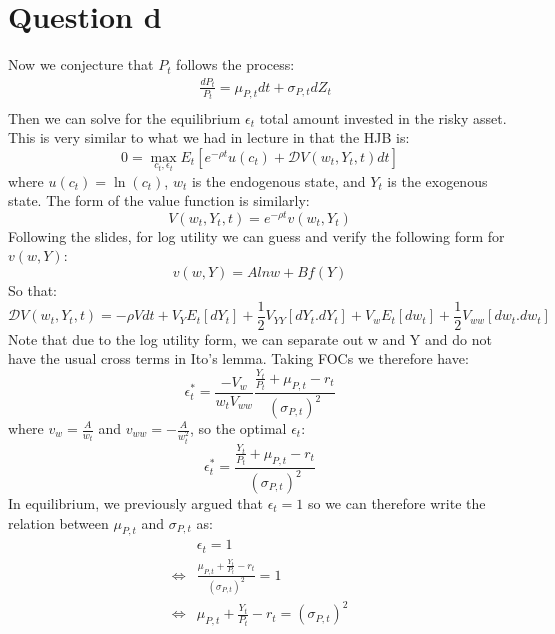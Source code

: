 \documentclass{article}
\begin{document}
\section*{Question d}
Now we conjecture that $P_t$ follows the process:
\[
\begin{aligned}
    &\frac{d P_{t}}{P_{t}}=\mu_{P, t} d t+\sigma_{P, t} d Z_{t}\\
\end{aligned}
\]
Then we can solve for the equilibrium $\epsilon_t$ total amount invested in the risky asset. This is very similar to what we had in lecture in that the HJB is:
\[
0 = \max_{c_t, \epsilon_t}E_t[e^{-\rho t}u(c_t) + \mathcal{D} V(w_t, Y_t, t) d t]    
\]
where $u(c_t) = \ln(c_t) $, $w_t$ is the endogenous state, and $Y_t$ is the exogenous state. The form of the value function is similarly:
\[
V(w_t, Y_t, t) = e^{-\rho t} v(w_t, Y_t)    
\]
Following the slides, for log utility we can guess and verify the following form for $v(w, Y)$:
\[
v(w,Y) = A ln w + B f(Y)
\]
So that:
\[
 \mathcal{D} V(w_t, Y_t, t) = -\rho V dt + V_YE_t[dY_t] + \frac{1}{2}V_{YY}[dY_t.dY_t]+V_wE_t[dw_t]+\frac{1}{2}V_{ww}[dw_t.dw_t]
\]
Note that due to the log utility form,  we can separate out w and Y and do not have the usual cross terms in Ito's lemma. Taking FOCs we therefore have:
\[
\epsilon_t^* = \frac{-V_w}{w_tV_{ww}}\frac{\frac{Y_t}{P_t} + \mu_{P, t} - r_t}{(\sigma_{P, t})^2}
\]
where $v_w=\frac{A}{w_t}$ and $v_{ww}=-\frac{A}{w_t^2}$, so the optimal $\epsilon_t$:
\[
\epsilon_t^* = \frac{\frac{Y_t}{P_t} + \mu_{P, t} - r_t}{(\sigma_{P, t})^2}    
\]
In equilibrium, we previously argued that $\epsilon_t = 1$ so we can therefore write the relation between $\mu_{P, t}$ and $\sigma_{P, t }$ as:
\[\begin{aligned}
   &\epsilon_t = 1   \\ 
    \iff &\frac{ \mu_{P, t} + \frac{Y_t}{P_t} - r_t}{(\sigma_{P, t})^2} = 1 \\
    \iff & \boxed{\mu_{P, t} + \frac{Y_t}{P_t} - r_t = (\sigma_{P, t})^2}
\end{aligned}\]
\end{document}
